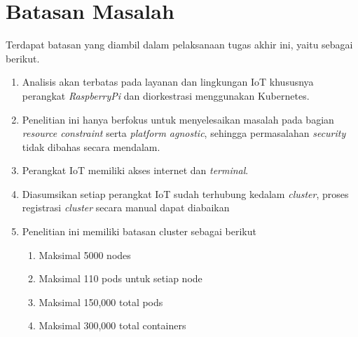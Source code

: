 \section{Batasan Masalah}
\label{sec:batasan-masalah}

Terdapat batasan yang diambil dalam pelaksanaan tugas akhir ini, yaitu sebagai berikut.

\begin{enumerate}
  \item Analisis akan terbatas pada layanan dan lingkungan IoT khususnya perangkat \textit{RaspberryPi} dan diorkestrasi menggunakan Kubernetes.
  \item Penelitian ini hanya berfokus untuk menyelesaikan masalah pada bagian \textit{resource constraint} serta \textit{platform agnostic}, sehingga permasalahan \textit{security} tidak dibahas secara mendalam.
  \item Perangkat IoT memiliki akses internet dan \textit{terminal}.
  \item Diasumsikan setiap perangkat IoT sudah terhubung kedalam \textit{cluster}, proses registrasi \textit{cluster} secara manual dapat diabaikan
  \item Penelitian ini memiliki batasan cluster sebagai berikut
        \begin{enumerate}
          \item Maksimal 5000 nodes
          \item Maksimal 110 pods untuk setiap node
          \item Maksimal 150,000 total pods
          \item Maksimal 300,000 total containers
        \end{enumerate}
\end{enumerate}

